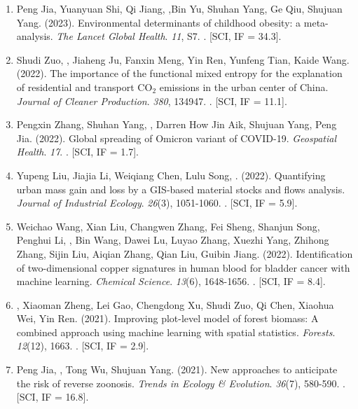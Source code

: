 \begin{enumerate}
\item
    Peng Jia, Yuanyuan Shi, Qi Jiang, \Shaoqing,Bin Yu, Shuhan Yang, Ge Qiu, Shujuan Yang. (2023).
    Environmental determinants of childhood obesity: a meta-analysis.
    \textit{The Lancet Global Health}. \textit{11}, S7.
    . [SCI, IF = 34.3].
\item
    Shudi Zuo, \Shaoqing, Jiaheng Ju, Fanxin Meng, Yin Ren, Yunfeng Tian, Kaide Wang. (2022).
    The importance of the functional mixed entropy for the explanation of residential and transport CO$_2$ emissions in the urban center of China.
    \textit{Journal of Cleaner Production}. \textit{380}, 134947.
    . [SCI, IF = 11.1].
\item
    Pengxin Zhang, Shuhan Yang, \Shaoqing, Darren How Jin Aik, Shujuan Yang, Peng Jia. (2022).
    Global spreading of Omicron variant of COVID-19.
    \textit{Geospatial Health}. \textit{17}.
    . [SCI, IF = 1.7].
\item
    Yupeng Liu, Jiajia Li, Weiqiang Chen, Lulu Song, \Shaoqing. (2022).
    Quantifying urban mass gain and loss by a GIS‐based material stocks and flows analysis.
    \textit{Journal of Industrial Ecology}. \textit{26}(3), 1051-1060.
    . [SCI, IF = 5.9].
\item
    Weichao Wang, Xian Liu, Changwen Zhang, Fei Sheng, Shanjun Song, Penghui Li, \Shaoqing, Bin Wang, Dawei Lu, Luyao Zhang, Xuezhi Yang, Zhihong Zhang, Sijin Liu, Aiqian Zhang, Qian Liu, Guibin Jiang. (2022).
    Identification of two-dimensional copper signatures in human blood for bladder cancer with machine learning.
    \textit{Chemical Science}. \textit{13}(6), 1648-1656.
    . [SCI, IF = 8.4].
\item
    \Shaoqing\CF, Xiaoman Zheng\CF, Lei Gao, Chengdong Xu, Shudi Zuo, Qi Chen, Xiaohua Wei, Yin Ren. (2021).
    Improving plot-level model of forest biomass: A combined approach using machine learning with spatial statistics.
    \textit{Forests}. \textit{12}(12), 1663.
    . [SCI, IF = 2.9].
\item
    Peng Jia, \Shaoqing, Tong Wu, Shujuan Yang. (2021).
    New approaches to anticipate the risk of reverse zoonosis.
    \textit{Trends in Ecology \& Evolution}. \textit{36}(7), 580-590.
    . [SCI, IF = 16.8].

\end{enumerate}
